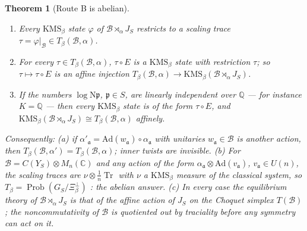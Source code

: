 \documentclass[11pt]{amsart}
\numberwithin{equation}{section}
\newtheorem{theorem}{Theorem}[section]
\theoremstyle{definition}
\theoremstyle{remark}
\newcommand{\Q}{\mathbb{Q}}
\newcommand{\C}{\mathbb{C}}
\newcommand{\cB}{\mathcal{B}}
\newcommand{\pp}{\mathfrak{p}}
\newcommand{\aaa}{\mathfrak{a}}
\newcommand{\Ns}{\mathrm{N}}
\newcommand{\Tr}{\operatorname{Tr}}
\newcommand{\Prob}{\operatorname{Prob}}
\begin{document}
\begin{theorem}[Route B is abelian]\label{thm:B}
\begin{enumerate}
\item Every $\mathrm{KMS}_\beta$ state $\varphi$ of $\cB\rtimes_\alpha J_S$ restricts to a
scaling trace $\tau=\varphi|_\cB\in T_\beta(\cB,\alpha)$.
\item For every $\tau\in T_\beta(\cB,\alpha)$, $\tau\circ E$ is a $\mathrm{KMS}_\beta$ state
with restriction $\tau$; so $\tau\mapsto\tau\circ E$ is an affine injection
$T_\beta(\cB,\alpha)\to\mathrm{KMS}_\beta(\cB\rtimes_\alpha J_S)$.
\item If the numbers $\log\Ns\pp$, $\pp\in S$, are linearly independent over $\Q$ --- for
instance $K=\Q$ --- then every $\mathrm{KMS}_\beta$ state is of the form $\tau\circ E$, and
$\mathrm{KMS}_\beta(\cB\rtimes_\alpha J_S)\cong T_\beta(\cB,\alpha)$ affinely.
\end{enumerate}
Consequently: (a) if $\alpha'_\aaa=\mathrm{Ad}(w_\aaa)\circ\alpha_\aaa$ with unitaries
$w_\aaa\in\cB$ is another action, then $T_\beta(\cB,\alpha')=T_\beta(\cB,\alpha)$; inner twists
are invisible. (b) For $\cB=C(Y_S)\otimes M_n(\C)$ and any action of the form
$\alpha_\aaa\otimes\mathrm{Ad}(v_\aaa)$, $v_\aaa\in U(n)$, the scaling traces are
$\nu\otimes\frac1n\Tr$ with $\nu$ a $\mathrm{KMS}_\beta$ measure of the classical system, so
$T_\beta=\Prob(G_S/\Xi_\beta^\perp)$ \cite[Thm.~3.6]{Main}: the abelian answer. (c) In every
case the equilibrium theory of $\cB\rtimes_\alpha J_S$ is that of the affine action of
$J_S$ on the Choquet simplex $T(\cB)$; the noncommutativity of $\cB$ is quotiented out by
traciality before any symmetry can act on it.
\end{theorem}
\end{document}
